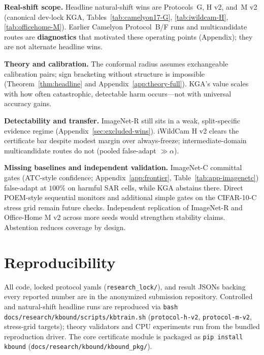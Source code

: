 \documentclass[11pt]{article}
\theoremstyle{plain}
\theoremstyle{definition}
\theoremstyle{remark}
\begin{document}
\textbf{Real-shift scope.} Headline natural-shift wins are Protocols~G, H v2, and~M v2
(canonical dev-lock \textsc{KGA}, Tables~\ref{tab:camelyon17-G}, \ref{tab:iwildcam-H},
\ref{tab:officehome-M}). Earlier Camelyon Protocol~B/F runs and multicandidate routes are
\textbf{diagnostics} that motivated these operating points (Appendix); they are not alternate headline
wins.

\textbf{Theory and calibration.} The conformal radius assumes exchangeable calibration pairs;
sign bracketing without structure is impossible (Theorem~\ref{thm:headline} and
Appendix~\ref{app:theory-full}). \textsc{KGA}'s value scales with how often catastrophic,
detectable harm occurs---not with universal accuracy gains.

\textbf{Detectability and transfer.} ImageNet-R still sits in a weak, split-specific
evidence regime (Appendix~\ref{sec:excluded-wins}). iWildCam H v2 clears the certificate bar
despite modest margin over always-freeze; intermediate-domain multicandidate routes do not
(pooled false-adapt $\gg\alpha$).

\textbf{Missing baselines and independent validation.} ImageNet-C committal gates
(ATC-style confidence; Appendix~\ref{app:frontier}, Table~\ref{tab:app-imagenetc}) false-adapt at
$100\%$ on harmful SAR cells, while \textsc{KGA} abstains there. Direct POEM-style sequential
monitors and additional simple gates on the CIFAR-10-C stress grid remain future checks.
Independent replication of ImageNet-R and Office-Home M v2 across more seeds would strengthen
stability claims. Abstention reduces coverage by design.

\begin{center}
\end{center}

\section{Reproducibility}\label{sec:repro-main}
All code, locked protocol yamls (\texttt{research\_lock/}), and result JSONs backing every
reported number are in the anonymized submission repository. Controlled and natural-shift
headline runs are reproduced via \texttt{bash docs/research/kbound/scripts/kbtrain.sh}
(\texttt{protocol-h-v2}, \texttt{protocol-m-v2}, stress-grid targets); theory validators and
CPU experiments run from the bundled reproduction driver. The core certificate module is
packaged as \texttt{pip install kbound} (\texttt{docs/research/kbound/kbound\_pkg/}).
\end{document}
